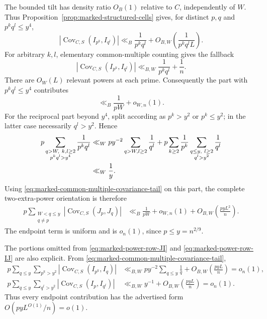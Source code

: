 \documentclass[11pt]{article}
\numberwithin{equation}{section}
\theoremstyle{definition}
\theoremstyle{remark}
\newcommand{\1}{\mathbf 1}
\begin{document}
The bounded tilt has density ratio \(O_B(1)\) relative to \(C\),
independently of \(W\).  Thus Proposition~\ref{prop:marked-structured-cells} gives,
for distinct \(p,q\) and \(p^kq^l\le y^4\),
\begin{equation}
 |\operatorname{Cov}_{C,S}(I_{p^k},I_{q^l})|
 \ll_B\frac1{p^kq^l}
       +O_{B,W}\!\left(\frac1{p^kq^lL}\right).
 \label{eq:marked-common-multiple-covariance}
\end{equation}
For arbitrary \(k,l\), elementary common-multiple counting gives the
fallback
\begin{equation}
 |\operatorname{Cov}_{C,S}(I_{p^k},I_{q^l})|
 \ll_{B,W}\frac1{p^kq^l}+\frac1n.
 \label{eq:marked-common-multiple-covariance-tail}
\end{equation}
There are \(O_W(L)\) relevant powers at each prime.  Consequently the
part with \(p^kq^l\le y^4\) contributes
\[
 \ll_B\frac1{pW}+o_{W,n}(1).
\]
For the reciprocal part beyond \(y^4\), split according as
\(p^k>y^2\) or \(p^k\le y^2\); in the latter case necessarily
\(q^l>y^2\).  Hence
\begin{align}
 p\sum_{\substack{q>W,\ k,l\ge2\\p^kq^l>y^4}}
       \frac1{p^kq^l}
 &\ll_W
 py^{-2}\sum_{q>W,l\ge2}\frac1{q^l}
 +p\sum_{k\ge2}\frac1{p^k}
       \sum_{\substack{q\le y,\ l\ge2\\q^l>y^2}}\frac1{q^l}\notag\\
 &\ll_W\frac1y.
 \label{eq:marked-JJ-reciprocal-tail}
\end{align}
Using \eqref{eq:marked-common-multiple-covariance-tail} on this part,
the complete two-extra-power orientation is therefore
\begin{align}
 p\sum_{\substack{W<q\le y\\q\ne p}}
 |\operatorname{Cov}_{C,S}(J_p,J_q)|
 &\ll_B\frac1{pW}+o_{W,n}(1)
       +O_{B,W}\!\left(\frac{pyL^2}{n}\right).
 \label{eq:marked-power-row-JJ}
\end{align}
The endpoint term is uniform and is \(o_n(1)\), since
\(p\le y=n^{2/9}\).

The portions omitted from \eqref{eq:marked-power-row-JI} and
\eqref{eq:marked-power-row-IJ} are also explicit.  From
\eqref{eq:marked-common-multiple-covariance-tail},
\begin{align}
 p\sum_{q\le y}\sum_{p^k>y^2}
 |\operatorname{Cov}_{C,S}(I_{p^k},I_q)|
 &\ll_{B,W}py^{-2}\sum_{q\le y}\frac1q
       +O_{B,W}\!\left(\frac{pyL}{n}\right)=o_n(1),
 \label{eq:marked-power-tail-JI}\\
 p\sum_{q\le y}\sum_{q^l>y^2}
 |\operatorname{Cov}_{C,S}(I_p,I_{q^l})|
 &\ll_{B,W}y^{-1}
       +O_{B,W}\!\left(\frac{pyL}{n}\right)=o_n(1).
 \label{eq:marked-power-tail-IJ}
\end{align}
Thus every endpoint contribution has the advertised form
\(O(pyL^{O(1)}/n)=o(1)\).
\end{document}
